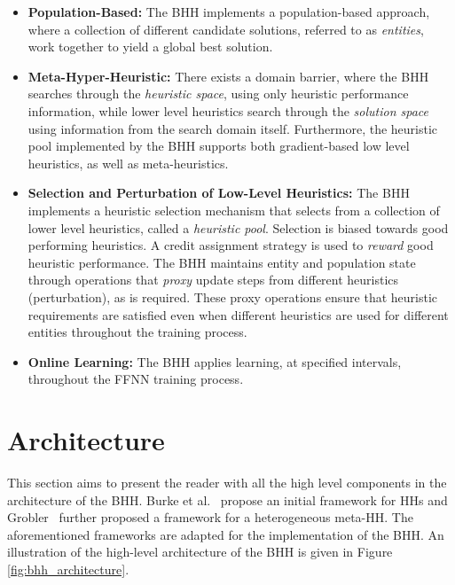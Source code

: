\begin{itemize}
      \item \textbf{Population-Based:} The \acs{BHH} implements a population-based approach, where a collection of different candidate solutions, referred to as \textit{entities}, work together to yield a global best solution.

      \item \textbf{Meta-Hyper-Heuristic:} There exists a domain barrier, where the \acs{BHH} searches through the \textit{heuristic space}, using only heuristic performance information, while lower level heuristics search through the \textit{solution space} using information from the search domain itself. Furthermore, the heuristic pool implemented by the \acs{BHH} supports both gradient-based low level heuristics, as well as meta-heuristics.

      \item \textbf{Selection and Perturbation of Low-Level Heuristics:} The \acs{BHH} implements a heuristic selection mechanism that selects from a collection of lower level heuristics, called a \textit{heuristic pool}. Selection is biased towards good performing heuristics. A credit assignment strategy is used to \textit{reward} good heuristic performance. The \acs{BHH} maintains entity and population state through operations that \textit{proxy} update steps from different heuristics (perturbation), as is required. These proxy operations ensure that heuristic requirements are satisfied even when different heuristics are used for different entities throughout the training process.

      \item \textbf{Online Learning:} The \acs{BHH} applies learning, at specified intervals, throughout the \acs{FFNN} training process.
\end{itemize}

\section{Architecture}\label{sec:bhh:architecture}

This section aims to present the reader with all the high level components in the architecture of the \Acs{BHH}. Burke et al.~\cite{ref:burke:2010} propose an initial framework for \acp{HH} and Grobler~\cite{ref:grobler:2015} further proposed a framework for a heterogeneous meta-\ac{HH}. The aforementioned frameworks are adapted for the implementation of the \Acs{BHH}. An illustration of the high-level architecture of the \Acs{BHH} is given in Figure \ref{fig:bhh_architecture}.

